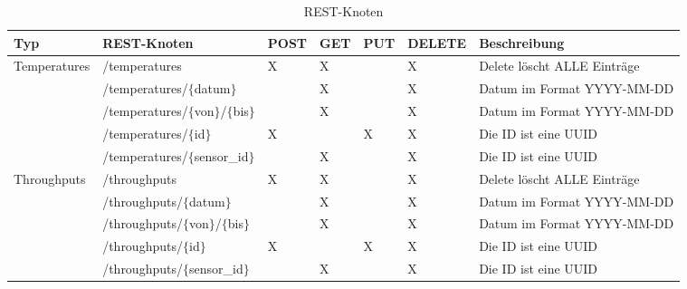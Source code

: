 \begin{landscape}
  \begin{table}[H]
    \begin{longtable}{lllllll}
      \textbf{Typ}                    & \textbf{REST-Knoten}                  & \textbf{POST} & \textbf{GET} & \textbf{PUT} & \textbf{DELETE} & \textbf{Beschreibung}     \\ \toprule
      \multirow{5}{*}{Temperatures}   & /temperatures                         & X & X &   & X & Delete löscht ALLE Einträge                                               \\
                                      & /temperatures/$\{$datum$\}$           &   & X &   & X & Datum im Format YYYY-MM-DD                                                \\
                                      & /temperatures/$\{$von$\}$/$\{$bis$\}$ &   & X &   & X & Datum im Format YYYY-MM-DD                                                \\
                                      & /temperatures/$\{$id$\}$              & X &   & X & X & Die ID ist eine UUID                                                      \\
                                      & /temperatures/$\{$sensor\_id$\}$      &   & X &   & X & Die ID ist eine UUID                                                      \\ \midrule
      \multirow{5}{*}{Throughputs}    & /throughputs                          & X & X &   & X & Delete löscht ALLE Einträge                                               \\
                                      & /throughputs/$\{$datum$\}$            &   & X &   & X & Datum im Format YYYY-MM-DD                                                \\
                                      & /throughputs/$\{$von$\}$/$\{$bis$\}$  &   & X &   & X & Datum im Format YYYY-MM-DD                                                \\
                                      & /throughputs/$\{$id$\}$               & X &   & X & X & Die ID ist eine UUID                                                      \\
                                      & /throughputs/$\{$sensor\_id$\}$       &   & X &   & X & Die ID ist eine UUID                                                      \\ \midrule
    \end{longtable}
    \caption{REST-Knoten}%
    \label{tbl:rest-knoten}
  \end{table}
\end{landscape}


